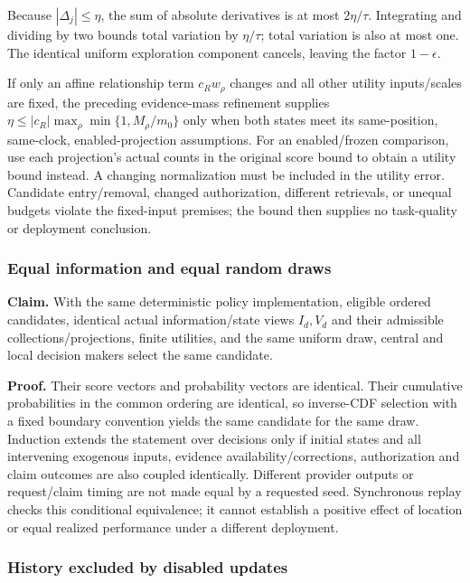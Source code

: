 \documentclass[
  english,
  11pt,
]{article}
\begin{document}
Because \(|\Delta_j|\leq\eta\), the sum of absolute derivatives is at
most \(2\eta/\tau\). Integrating and dividing by two bounds total
variation by \(\eta/\tau\); total variation is also at most one. The
identical uniform exploration component cancels, leaving the factor
\(1-\epsilon\).

If only an affine relationship term \(c_R w_\rho\) changes and all other
utility inputs/scales are fixed, the preceding evidence-mass refinement
supplies \(\eta\leq |c_R|\max_\rho\min\{1,M_\rho/m_0\}\) only when both
states meet its same-position, same-clock, enabled-projection
assumptions. For an enabled/frozen comparison, use each projection's
actual counts in the original score bound to obtain a utility bound
instead. A changing normalization must be included in the utility error.
Candidate entry/removal, changed authorization, different retrievals, or
unequal budgets violate the fixed-input premises; the bound then
supplies no task-quality or deployment conclusion.

\subsubsection{Equal information and equal random
draws}\label{equal-information-and-equal-random-draws}

\textbf{Claim.} With the same deterministic policy implementation,
eligible ordered candidates, identical actual information/state views
\(I_d,V_d\) and their admissible collections/projections, finite
utilities, and the same uniform draw, central and local decision makers
select the same candidate.

\textbf{Proof.} Their score vectors and probability vectors are
identical. Their cumulative probabilities in the common ordering are
identical, so inverse-CDF selection with a fixed boundary convention
yields the same candidate for the same draw. Induction extends the
statement over decisions only if initial states and all intervening
exogenous inputs, evidence availability/corrections, authorization and
claim outcomes are also coupled identically. Different provider outputs
or request/claim timing are not made equal by a requested seed.
Synchronous replay checks this conditional equivalence; it cannot
establish a positive effect of location or equal realized performance
under a different deployment.

\subsubsection{History excluded by disabled
updates}\label{history-excluded-by-disabled-updates}
\end{document}
